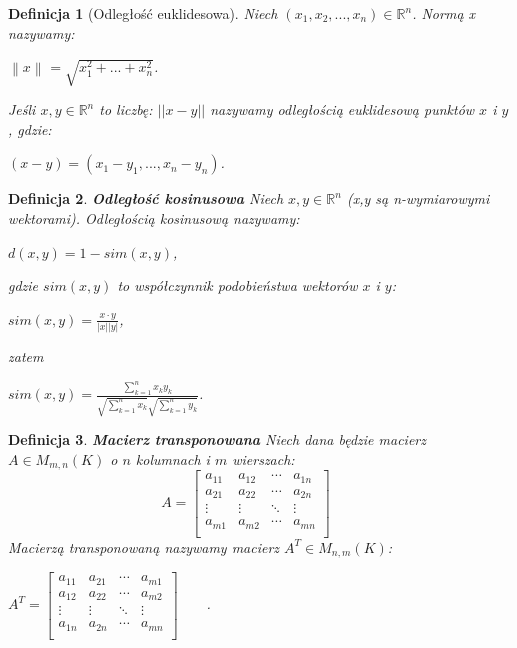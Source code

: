 \documentclass[12pt,a4paper]{report}
\newtheorem{df}{Definicja}[chapter]
\newcommand{\norm}[2][]{\left\| {#2} \right\|_{#1}}
\begin{document}
\begin{df}[Odległość euklidesowa] %
Niech $(x_1,x_2,...,x_n) \in \mathbb{R}^n $.
Normą x nazywamy:
\begin{center} 
$\norm{x} = \sqrt{x_{1}^{2} + ... + x_{n}^{2}}$.
\end{center}
Jeśli $x,y \in \mathbb{R}^n $ to liczbę:
$||x-y||$ nazywamy odległością euklidesową punktów $x$ i $y$, gdzie:
\begin{center}
$(x-y) = (x_1-y_1,...,x_n-y_n)$.
\end{center}
\end{df}
\begin{df}\textbf{Odległość kosinusowa} %
Niech $x,y \in \mathbb{R}^n $ (x,y są n-wymiarowymi wektorami). Odległością kosinusową nazywamy:
\begin{center}
$d(x,y) = 1 - sim (x,y)$, 
\end{center}
gdzie $sim (x,y)$ to współczynnik podobieństwa wektorów $x$ i $y$:
\begin{center}
$sim (x,y) = \frac{x \cdot y}{|x||y|}$,
\end{center}
zatem
\begin{center}
$sim (x,y) = \frac{\sum_{k=1}^n x_k y_k}{\sqrt{\sum_{k=1}^n x_k}\sqrt{\sum_{k=1}^n y_k}}$.
\end{center}
\end{df}
\begin{df}\textbf{Macierz transponowana}%
Niech dana będzie macierz $A \in M_{m,n}(K)$ o $n$ kolumnach i $m$ wierszach:
$$
A= \left[
        \begin{array}{cccc}
         a_{11} & a_{12} & \cdots & a_{1n} \\
         a_{21} & a_{22} & \cdots & a_{2n} \\
         \vdots & \vdots & \ddots & \vdots \\
         a_{m1} & a_{m2} & \cdots & a_{mn} \\
         \end{array}
      \right]
      \qquad 
$$
Macierzą transponowaną nazywamy macierz $A^T \in M_{n,m}(K)$:
\begin{center}
$ A^T= \left[
        \begin{array}{cccc}
         a_{11} & a_{21} & \cdots & a_{m1} \\
         a_{12} & a_{22} & \cdots & a_{m2} \\
         \vdots & \vdots & \ddots & \vdots \\
         a_{1n} & a_{2n} & \cdots & a_{mn} \\
         \end{array}
      \right]
      \qquad $.
\end{center}
\end{df}
\end{document}
